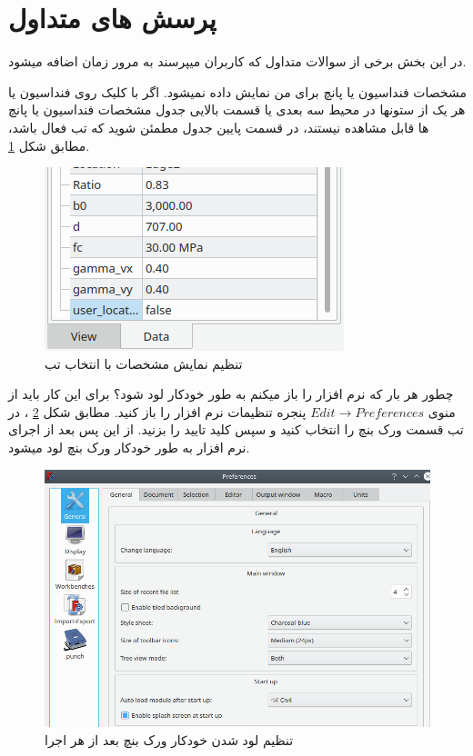 \newpage
\section{پرسش های متداول\label{faq}}

در این بخش برخی از سوالات متداول که کاربران میپرسند به مرور زمان اضافه میشود.

\begin{question}{مشخصات فنداسیون یا پانچ برای من نمایش داده نمیشود.}
\true 
اگر با کلیک روی فنداسیون یا هر یک از ستونها در محیط سه بعدی یا قسمت بالایی جدول
مشخصات فنداسیون یا پانچ ها قابل مشاهده نیستند، در قسمت پایین جدول مطمئن شوید که تب 
فعال باشد، مطابق شکل
\ref{fig:dataview}.
\end{question}

\begin{figure}[H]
    \centering
    \includegraphics{figures/dataview}
    \caption{تنظیم نمایش مشخصات با انتخاب تب }
    \label{fig:dataview}
\end{figure}


\begin{question}{چطور هر بار که نرم افزار را باز میکنم به طور خودکار 
    لود شود؟}
\true 
برای این کار باید از منوی
$Edit \rightarrow Preferences$
پنجره تنظیمات نرم افزار را باز کنید. مطابق شکل
\ref{fig:autoload}
، در تب
قسمت 
ورک بنچ 
را انتخاب کنید و سپس کلید تایید را بزنید. از این پس بعد از اجرای نرم افزار به طور خودکار ورک بنچ
لود میشود.
\end{question}


\begin{figure}[H]
    \centering
    \includegraphics[width=.7\linewidth]{figures/autoload}
    \caption{تنظیم لود شدن خودکار ورک بنچ  بعد از هر اجرا}
    \label{fig:autoload}
\end{figure}